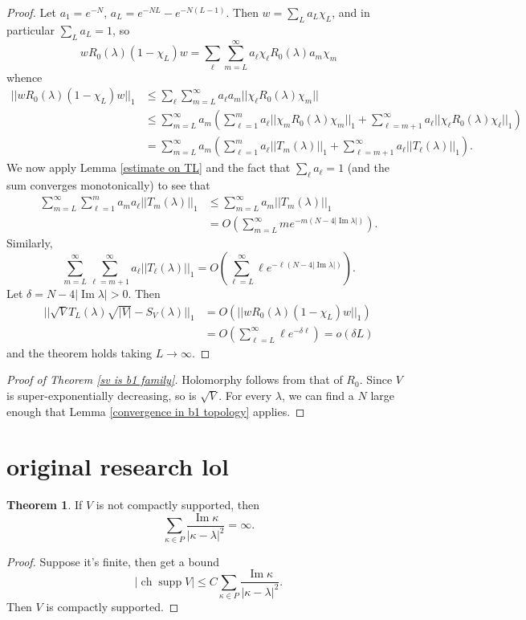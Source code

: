 \documentclass[12pt]{report}
\DeclareMathOperator{\ch}{ch}
\DeclareMathOperator{\supp}{supp}
\renewcommand{\Im}{\operatorname{Im}}
\theoremstyle{definition}
\newtheorem{theorem}{Theorem}[chapter]
\begin{document}
\begin{proof}
Let $a_1 = e^{-N}$, $a_L = e^{-NL} - e^{-N(L-1)}$. Then $w = \sum_L a_L \chi_L$, and in particular $\sum_L a_L = 1$, so
$$wR_0(\lambda)(1 - \chi_L)w = \sum_\ell \sum_{m=L}^\infty a_\ell\chi_\ell R_0(\lambda) a_m \chi_m$$
whence
\begin{align*}
  ||wR_0(\lambda)(1 - \chi_L)w||_1 &\leq \sum_\ell \sum_{m=L}^\infty a_\ell a_m ||\chi_\ell R_0(\lambda) \chi_m||\\
  &\leq \sum_{m=L}^\infty a_m \left(\sum_{\ell=1}^m a_\ell ||\chi_m R_0(\lambda) \chi_m||_1 + \sum_{\ell=m+1}^\infty a_\ell ||\chi_\ell R_0(\lambda) \chi_\ell||_1 \right)\\
  &= \sum_{m=L}^\infty a_m \left(\sum_{\ell=1}^m a_\ell ||T_m(\lambda)||_1 + \sum_{\ell=m+1}^\infty a_\ell ||T_\ell(\lambda)||_1 \right).
\end{align*}
We now apply Lemma \ref{estimate on TL} and the fact that $\sum_\ell a_\ell = 1$ (and the sum converges monotonically) to see that
\begin{align*}
  \sum_{m=L}^\infty\sum_{\ell=1}^m a_m a_\ell ||T_m(\lambda)||_1 &\leq \sum_{m=L}^\infty a_m ||T_m(\lambda)||_1\\
  &= O\left(\sum_{m=L}^\infty me^{-m(N-4|\Im \lambda|)}\right).
\end{align*}
Similarly,
$$\sum_{m=L}^\infty \sum_{\ell=m+1}^\infty a_\ell ||T_\ell(\lambda)||_1 = O\left(\sum_{\ell=L}^\infty \ell e^{-\ell(N-4|\Im \lambda|)}\right).$$
Let $\delta = N - 4|\Im \lambda| > 0$. Then
\begin{align*}
  ||\sqrt V T_L(\lambda) \sqrt{|V|} - S_V(\lambda)||_1 &= O(||wR_0(\lambda)(1 - \chi_L)w||_1) \\
  &= O\left(\sum_{\ell=L}^\infty \ell e^{-\delta \ell} \right) = o(\delta L)
\end{align*}
and the theorem holds taking $L \to \infty$.
\end{proof}

\begin{proof}[Proof of Theorem \ref{sv is b1 family}]
Holomorphy follows from that of $R_0$. Since $V$ is super-exponentially decreasing, so is $\sqrt V$. For every $\lambda$, we can find a $N$ large enough that Lemma \ref{convergence in b1 topology} applies.
\end{proof}



\section{original research lol}
\begin{theorem}
If $V$ is not compactly supported, then
$$\sum_{\kappa \in P} \frac{\Im \kappa}{|\kappa - \lambda|^2} = \infty.$$
\end{theorem}
\begin{proof}
Suppose it's finite, then get a bound
$$|\ch\supp V| \leq C \sum_{\kappa \in P}\frac{\Im \kappa}{|\kappa - \lambda|^2}.$$
Then $V$ is compactly supported.
\end{proof}





\printbibliography



\printindex
\end{document}
